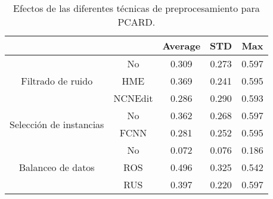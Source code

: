 \begin{table}[t]
    \centering
    \begin{tabular}{cc|c|c|c|}
    \cline{3-5}
    \multicolumn{1}{l}{\textbf{}} & \textbf{} & \multicolumn{1}{c|}{\textbf{Average}} & \multicolumn{1}{c|}{\textbf{STD}} & \textbf{Max} \\ \hline
    \multicolumn{1}{|c|}{\multirow{3}{*}{Filtrado de ruido}}       & No        & 0.309   & 0.273
    & 0.597        \\ \cline{2-5} 
    \multicolumn{1}{|c|}{}  & HME       & 0.369   &  0.241
    & 0.595        \\ \cline{2-5} 
    \multicolumn{1}{|c|}{}  & NCNEdit   & 0.286   &  0.290
    & 0.593        \\ \hline
    \multicolumn{1}{|c|}{\multirow{2}{*}{Selección de instancias}} & No        & 0.362   & 0.268
    & 0.597        \\ \cline{2-5} 
    \multicolumn{1}{|c|}{}  & FCNN      & 0.281   & 0.252
    & 0.595        \\ \hline
    \multicolumn{1}{|c|}{\multirow{3}{*}{Balanceo de datos}}       & No        & 0.072   & 0.076
    & 0.186        \\ \cline{2-5} 
    \multicolumn{1}{|c|}{}  & ROS       & 0.496   & 0.325
    & 0.542        \\ \cline{2-5} 
    \multicolumn{1}{|c|}{}  & RUS       & 0.397   & 0.220
    & 0.597        \\ \hline
    \end{tabular}
    \caption{Efectos de las diferentes técnicas de preprocesamiento para PCARD.}
    \label{pcard}
\end{table}

